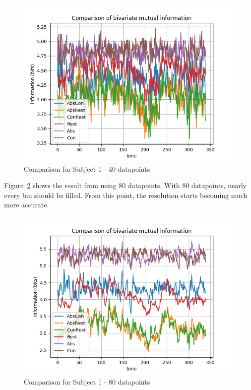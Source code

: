 \begin{figure}[!htb]
\caption{Comparison for Subject 1 - 40 datapoints}
\label{40-trials}
    \centering
    \includegraphics[width=\textwidth]{fig/subject1_40trials_all-channel-1}
\end{figure}

Figure~\ref{80-trials} shows the result from using 80 datapoints. With 80 datapoints, nearly every bin should be filled. From this point, the resolution starts becoming much more accurate. 

\begin{figure}[!htb]
\caption{Comparison for Subject 1 - 80 datapoints}
\label{80-trials}
    \centering
    \includegraphics[width=\textwidth]{fig/subject1_80trials_all-channel-1}
\end{figure}

